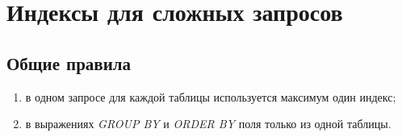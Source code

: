 \section{Индексы для сложных запросов}

\subsection{Общие правила}
\begin{enumerate}
\item в одном запросе для каждой таблицы используется максимум один индекс;
\item в выражениях \textit{GROUP BY} и \textit{ORDER BY} поля только из одной таблицы.
\end{enumerate}
